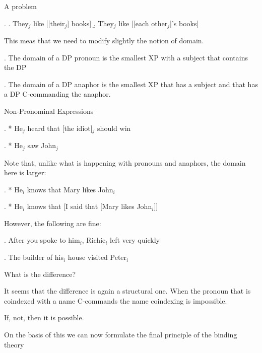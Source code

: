 \begin{frame}
  {A problem}

\ex.
\a. They$_j$ like [[their$_j$] books]
\b. They$_j$ like [[each other$_j$]'s books]

This meas that we need to modify slightly the notion of domain.

\end{frame}





\begin{frame}
  \ex. 
The domain of a DP pronoun is the smallest XP with a subject that contains the DP


\ex.
The domain of a DP anaphor is the smallest XP that has a subject and that has a DP C-commanding the anaphor.


\end{frame}


\begin{frame}
  {Non-Pronominal Expressions}

\ex.
* He$_j$ heard that [the idiot]$_j$ should win


\ex.
* He$_j$ saw John$_j$

\end{frame}





\begin{frame}
  Note that, unlike what is happening with pronouns and anaphors, the domain here is larger:

\ex.
* He$_i$ knows that Mary likes  John$_i$

\ex.
* He$_i$ knows that [I said that [Mary likes  John$_i$]]


\pause

However, the following are fine:

\ex.
After you spoke to him$_i$, Richie$_i$ left very quickly

\ex.
The builder of his$_i$ house visited Peter$_i$


What is the difference?
\end{frame}


\begin{frame}
  It seems that the difference is again a structural one.  When the pronoun that is coindexed with a name C-commands the name coindexing is impossible.

If, not, then it is possible.

On the basis of this we can now formulate the final principle of the binding theory
\end{frame}


